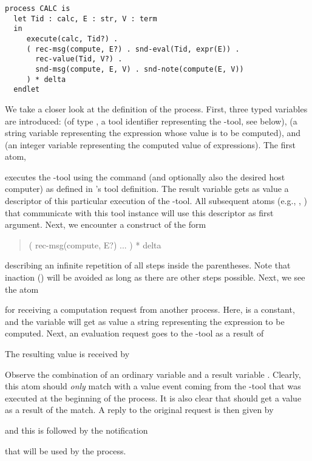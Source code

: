 \small
\begin{verbatim}
process CALC is
  let Tid : calc, E : str, V : term
  in
     execute(calc, Tid?) .
     ( rec-msg(compute, E?) . snd-eval(Tid, expr(E)) .
       rec-value(Tid, V?) .
       snd-msg(compute, E, V) . snd-note(compute(E, V))
     ) * delta
  endlet

\end{verbatim}
\noindent
\normalsize
 We take a closer look at the definition of the  process.
 First, three typed variables are introduced:  (of type ,
 a tool identifier representing the -tool, see below),
  (a string variable representing the expression whose value is to be computed),
 and  (an integer variable representing the computed value of expressions).
 The first atom,
 \begin{quote}
 \end{quote}
 executes the -tool using the
 command (and optionally also the desired host computer)
 as defined in 's tool definition.  The
 result variable  gets as value a descriptor of
 this particular execution of the -tool. All
 subsequent atoms (e.g., , )
 that communicate with this tool instance will use this descriptor as
 first argument. Next, we encounter a construct of the form
 \begin{quote}
 ( rec-msg(compute, E?)
   ...
 ) * delta
 \end{quote}
 describing an infinite repetition of all steps inside the parentheses.
 Note that inaction () will be avoided as long as there
 are other steps possible.
 Next, we see the atom
 \begin{quote}
 \end{quote}
 for receiving a computation request from another process. Here, 
 is a constant, and the variable  will get as value a string
 representing the expression to be computed. Next, an evaluation request
 goes to the -tool as a result of
 \begin{quote}
 \end{quote}
 The resulting value is received by
 \begin{quote}
 \end{quote}
 Observe the combination of an ordinary variable  and
 a result variable .  Clearly, this atom should {\em only}
 match with a value event coming from the -tool that was
 executed at the beginning of the  process.  It is also
 clear that  should get a value as a result of the match.
 A reply to the original request  is then given by
 \begin{quote}
 \end{quote}
 and this is followed by the notification
 \begin{quote}
 \end{quote}
 that will be used by the  process.

